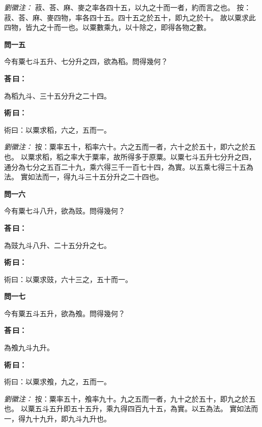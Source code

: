 \documentclass[11pt,a4paper]{article}
\newenvironment{problem}[1][]{%
  \par\vspace{0.6em}\noindent\textcolor{problemcolor}{\textbf{問\ignorespaces#1\unskip}\hspace{0.5em}}%
  \ignorespaces
}{\par\vspace{0.4em}}
\newenvironment{answer}{%
  \par\noindent\textcolor{answercolor}{\textbf{荅\,曰：}}%
  \ignorespaces
}{\par\vspace{0.3em}}
\newenvironment{method}{%
  \par\noindent\textcolor{methodcolor}{\textbf{術\,曰：}}%
  \ignorespaces
}{\par\vspace{0.4em}}
\newenvironment{liuhuicomm}{%
  \par\vspace{0.3em}\noindent\textcolor{commentarycolor}{\small\textit{劉徽注：}}}%
  {\par\vspace{0.5em}}
\begin{document}
\begin{liuhuicomm}
菽、荅、麻、麥之率各四十五，以九之十而一者，約而言之也。
按：菽、荅、麻、麥四物，率各四十五。四十五之於五十，即九之於十。
故以粟求此四物，皆九之十而一也。以粟數乘九，以十除之，即得各物之數。
\end{liuhuicomm}

\begin{problem}[一五]
今有粟七斗五升、七分升之四，欲為稻。問得幾何？
\end{problem}

\begin{answer}
為稻九斗、三十五分升之二十四。
\end{answer}

\begin{method}
術曰：以粟求稻，六之，五而一。
\end{method}

\begin{liuhuicomm}
按：粟率五十，稻率六十。六之五而一者，六十之於五十，即六之於五也。
以粟求稻，稻之率大于粟率，故所得多于原粟。以粟七斗五升七分升之四，
通分為七分之五百二十九，乘六得三千一百七十四，為實。以五乘七得三十五為法。
實如法而一，得九斗三十五分升之二十四也。
\end{liuhuicomm}

\begin{problem}[一六]
今有粟七斗八升，欲為豉。問得幾何？
\end{problem}

\begin{answer}
為豉九斗八升、二十五分升之七。
\end{answer}

\begin{method}
術曰：以粟求豉，六十三之，五十而一。
\end{method}

\begin{problem}[一七]
今有粟五斗五升，欲為飧。問得幾何？
\end{problem}

\begin{answer}
為飧九斗九升。
\end{answer}

\begin{method}
術曰：以粟求飧，九之，五而一。
\end{method}

\begin{liuhuicomm}
按：粟率五十，飧率九十。九之五而一者，九十之於五十，即九之於五也。
以粟五斗五升即五十五升，乘九得四百九十五，為實。以五為法。
實如法而一，得九十九升，即九斗九升也。
\end{liuhuicomm}
\end{document}
